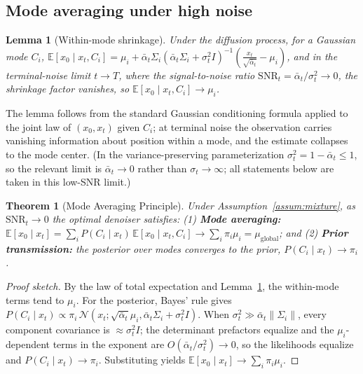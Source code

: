 \documentclass[11pt]{article}
\newtheorem{lemma}{Lemma}
\newtheorem{theorem}{Theorem}
\begin{document}
\subsection{Mode averaging under high noise}

\begin{lemma}[Within-mode shrinkage]\label{lem:shrinkage}
Under the diffusion process, for a Gaussian mode $C_i$,
$\mathbb{E}[x_0 \mid x_t, C_i] = \mu_i + \bar{\alpha}_t\Sigma_i(\bar{\alpha}_t\Sigma_i + \sigma_t^2 I)^{-1}\!\left(\tfrac{x_t}{\sqrt{\bar{\alpha}_t}} - \mu_i\right)$,
and in the terminal-noise limit $t \to T$, where the signal-to-noise ratio $\mathrm{SNR}_t = \bar{\alpha}_t/\sigma_t^2 \to 0$, the shrinkage factor vanishes, so $\mathbb{E}[x_0 \mid x_t, C_i] \to \mu_i$.
\end{lemma}

The lemma follows from the standard Gaussian conditioning formula applied to the joint law of $(x_0,x_t)$ given $C_i$; at terminal noise the observation carries vanishing information about position within a mode, and the estimate collapses to the mode center. (In the variance-preserving parameterization $\sigma_t^2 = 1-\bar{\alpha}_t \le 1$, so the relevant limit is $\bar{\alpha}_t \to 0$ rather than $\sigma_t \to \infty$; all statements below are taken in this low-SNR limit.)

\begin{theorem}[Mode Averaging Principle]\label{thm:MAP}
Under Assumption~\ref{assum:mixture}, as $\mathrm{SNR}_t \to 0$ the optimal denoiser satisfies:
(1) \textbf{Mode averaging:} $\mathbb{E}[x_0 \mid x_t] = \sum_i P(C_i \mid x_t)\,\mathbb{E}[x_0 \mid x_t, C_i] \to \sum_i \pi_i\mu_i = \mu_{\mathrm{global}}$; and
(2) \textbf{Prior transmission:} the posterior over modes converges to the prior, $P(C_i \mid x_t) \to \pi_i$.
\end{theorem}

\begin{proof}[Proof sketch]
By the law of total expectation and Lemma~\ref{lem:shrinkage}, the within-mode terms tend to $\mu_i$. For the posterior, Bayes' rule gives $P(C_i\mid x_t) \propto \pi_i\,\mathcal{N}(x_t;\sqrt{\bar{\alpha}_t}\mu_i, \bar{\alpha}_t\Sigma_i+\sigma_t^2 I)$. When $\sigma_t^2 \gg \bar{\alpha}_t\|\Sigma_i\|$, every component covariance is $\approx \sigma_t^2 I$; the determinant prefactors equalize and the $\mu_i$-dependent terms in the exponent are $O(\bar{\alpha}_t/\sigma_t^2)\to 0$, so the likelihoods equalize and $P(C_i\mid x_t)\to\pi_i$. Substituting yields $\mathbb{E}[x_0\mid x_t]\to\sum_i\pi_i\mu_i$.
\end{proof}
\end{document}
